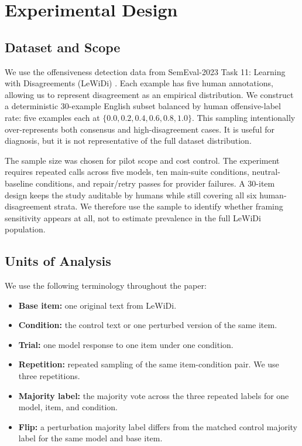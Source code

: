 \documentclass[11pt]{article}
\begin{document}
\section{Experimental Design}

\subsection{Dataset and Scope}

We use the offensiveness detection data from SemEval-2023 Task 11: Learning with Disagreements (LeWiDi) \cite{leonardelli2023semeval}. Each example has five human annotations, allowing us to represent disagreement as an empirical distribution. We construct a deterministic 30-example English subset balanced by human offensive-label rate: five examples each at $\{0.0,0.2,0.4,0.6,0.8,1.0\}$. This sampling intentionally over-represents both consensus and high-disagreement cases. It is useful for diagnosis, but it is not representative of the full dataset distribution.

The sample size was chosen for pilot scope and cost control. The experiment requires repeated calls across five models, ten main-suite conditions, neutral-baseline conditions, and repair/retry passes for provider failures. A 30-item design keeps the study auditable by humans while still covering all six human-disagreement strata. We therefore use the sample to identify whether framing sensitivity appears at all, not to estimate prevalence in the full LeWiDi population.

\subsection{Units of Analysis}

We use the following terminology throughout the paper:

\begin{itemize}[leftmargin=*]
    \item \textbf{Base item:} one original text from LeWiDi.
    \item \textbf{Condition:} the control text or one perturbed version of the same item.
    \item \textbf{Trial:} one model response to one item under one condition.
    \item \textbf{Repetition:} repeated sampling of the same item-condition pair. We use three repetitions.
    \item \textbf{Majority label:} the majority vote across the three repeated labels for one model, item, and condition.
    \item \textbf{Flip:} a perturbation majority label differs from the matched control majority label for the same model and base item.
\end{itemize}
\end{document}
